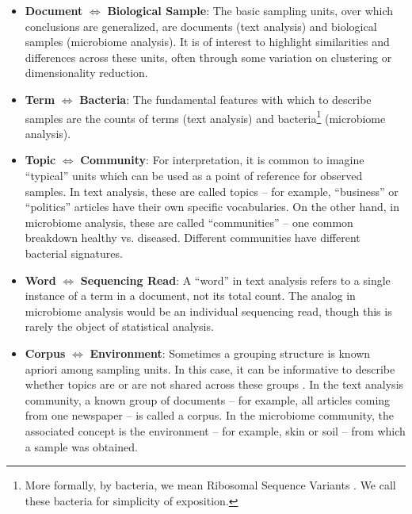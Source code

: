 \documentclass[oupdraft]{bio}
\begin{document}
\begin{itemize}
  \item \textbf{Document} $\iff$ \textbf{Biological Sample}: The basic sampling
    units, over which conclusions are generalized, are documents (text analysis)
    and biological samples (microbiome analysis). It is of interest to highlight
    similarities and differences across these units, often through some
    variation on clustering or dimensionality reduction.
  \item \textbf{Term} $\iff$ \textbf{Bacteria}: The fundamental features
    with which to describe samples are the counts of terms (text analysis) and
    bacteria\footnote{More formally, by bacteria, we mean Ribosomal Sequence
      Variants \citep{callahan2016dada2}. We call these bacteria for simplicity
      of exposition.} (microbiome analysis).
  \item \textbf{Topic} $\iff$ \textbf{Community}: For interpretation, it is
    common to imagine ``typical'' units which can be used as a point of
    reference for observed samples. In text analysis, these are called topics --
    for example, ``business'' or ``politics'' articles have their own specific
    vocabularies. On the other hand, in microbiome analysis, these are called
    ``communities'' -- one common breakdown healthy vs. diseased. Different
    communities have different bacterial signatures.
  \item \textbf{Word} $\iff$ \textbf{Sequencing Read}: A ``word'' in text analysis refers
    to a single instance of a term in a document, not its total count. The
    analog in microbiome analysis would be an individual sequencing read, though
    this is rarely the object of statistical analysis.
  \item \textbf{Corpus} $\iff$ \textbf{Environment}: Sometimes a grouping
    structure is known apriori among sampling units. In this case, it can be
    informative to describe whether topics are or are not shared across these
    groups \citep{teh2004sharing}. In the text analysis community, a known group
    of documents -- for example, all articles coming from one newspaper -- is
    called a corpus. In the microbiome community, the associated concept is the
    environment -- for example, skin or soil -- from which a sample was
    obtained.
\end{itemize}
\end{document}
